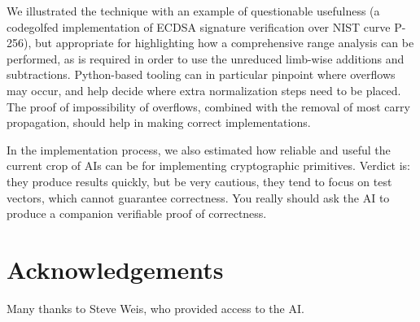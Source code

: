\documentclass{llncs}
\begin{document}
We illustrated the technique with an example of questionable usefulness
(a codegolfed implementation of ECDSA signature verification over NIST
curve P-256), but appropriate for highlighting how a comprehensive range
analysis can be performed, as is required in order to use the unreduced
limb-wise additions and subtractions. Python-based tooling can in
particular pinpoint where overflows may occur, and help decide where
extra normalization steps need to be placed. The proof of impossibility
of overflows, combined with the removal of most carry propagation,
should help in making correct implementations.

In the implementation process, we also estimated how reliable and useful
the current crop of AIs can be for implementing cryptographic
primitives. Verdict is: they produce results quickly, but be very
cautious, they tend to focus on test vectors, which cannot guarantee
correctness. You really should ask the AI to produce a companion
verifiable proof of correctness.


\section*{Acknowledgements}\label{sec:acknowledge}

Many thanks to Steve Weis, who provided access to the AI.

\end{document}
